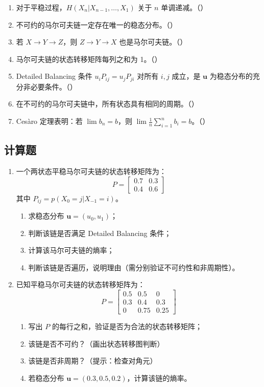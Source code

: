 \documentclass[12pt,a4paper]{ctexart}
\begin{document}
\begin{enumerate}[label=\arabic*., leftmargin=*]
\item 对于平稳过程，$H(X_n|X_{n-1},\ldots,X_1)$ 关于 $n$ 单调递减。（\quad）
\item 不可约的马尔可夫链一定存在唯一的稳态分布。（\quad）
\item 若 $X \to Y \to Z$，则 $Z \to Y \to X$ 也是马尔可夫链。（\quad）
\item 马尔可夫链的状态转移矩阵每列之和为 1。（\quad）
\item Detailed Balancing 条件 $u_i P_{ij} = u_j P_{ji}$ 对所有 $i,j$ 成立，是 $\mathbf{u}$ 为稳态分布的充分非必要条件。（\quad）
\item 在不可约的马尔可夫链中，所有状态具有相同的周期。（\quad）
\item Ces\`{a}ro 定理表明：若 $\lim b_n = b$，则 $\lim \frac{1}{n}\sum_{i=1}^n b_i = b$。（\quad）
\end{enumerate}

\subsection*{计算题}

\begin{enumerate}[label=\textbf{\arabic*.}, leftmargin=*]
\item 一个两状态平稳马尔可夫链的状态转移矩阵为：
\[
P = \begin{bmatrix}
0.7 & 0.3 \\
0.4 & 0.6
\end{bmatrix}
\]
其中 $P_{ij} = p(X_0=j|X_{-1}=i)$。
\begin{enumerate}
  \item 求稳态分布 $\mathbf{u} = (u_0, u_1)$；
  \item 判断该链是否满足 Detailed Balancing 条件；
  \item 计算该马尔可夫链的熵率；
  \item 判断该链是否遍历，说明理由（需分别验证不可约性和非周期性）。
\end{enumerate}

\item 已知平稳马尔可夫链的状态转移矩阵为：
\[
P = \begin{bmatrix}
0.5 & 0.5 & 0 \\
0.3 & 0.4 & 0.3 \\
0 & 0.75 & 0.25
\end{bmatrix}
\]
\begin{enumerate}
  \item 写出 $P$ 的每行之和，验证是否为合法的状态转移矩阵；
  \item 该链是否不可约？（画出状态转移图判断）
  \item 该链是否非周期？（提示：检查对角元）
  \item 若稳态分布 $\mathbf{u} = (0.3, 0.5, 0.2)$，计算该链的熵率。
\end{enumerate}
\end{enumerate}
\end{document}
